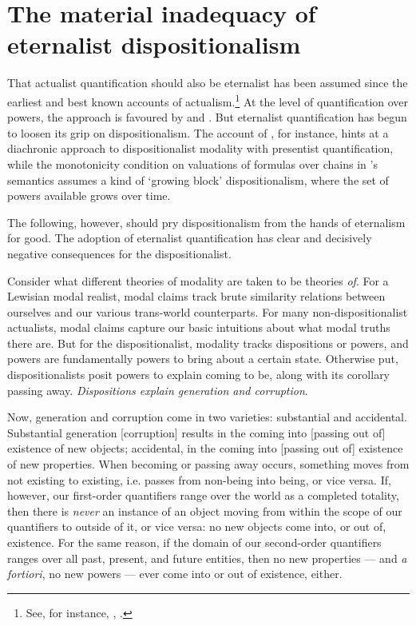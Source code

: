 \documentclass[]{article}
\begin{document}
\section{The material inadequacy of eternalist dispositionalism}
That actualist quantification should also be eternalist has been assumed since the earliest and best known accounts of actualism.\footnote{See, for instance, \cite{Plantinga1976}, \cite{Adams1981}.} At the level of quantification over powers, the approach is favoured by \cite{Yates2015} and \cite{Borghini2008}. But eternalist quantification has begun to loosen its grip on dispositionalism. The account of \cite{Vetter2013}, for instance, hints at a diachronic approach to dispositionalist modality with presentist quantification, while the monotonicity condition on valuations of formulas over chains in \cite{Jacobs2010}'s semantics assumes a kind of `growing block' dispositionalism, where the set of powers available grows over time.

The following, however, should pry dispositionalism from the hands of eternalism for good. The adoption of eternalist quantification has clear and decisively negative consequences for the dispositionalist. 

Consider what different theories of modality are taken to be theories \textit{of}. For a Lewisian modal realist, modal claims track brute similarity relations between ourselves and our various trans-world counterparts. For many non-dispositionalist actualists, modal claims capture our basic intuitions about what modal truths there are. But for the dispositionalist, modality tracks dispositions or powers, and powers are fundamentally powers to bring about a certain state. Otherwise put, dispositionalists posit powers to explain coming to be, along with its corollary passing away. \textit{Dispositions explain generation and corruption}.

Now, generation and corruption come in two varieties: substantial and accidental. Substantial generation [corruption] results in the coming into [passing out of] existence of new objects; accidental, in the coming into [passing out of] existence of new properties. When becoming or passing away occurs, something moves from not existing to existing, i.e. passes from non-being into being, or vice versa. If, however, our first-order quantifiers range over the world as a completed totality, then there is \textit{never} an instance of an object moving from within the scope of our quantifiers to outside of it, or vice versa: no new objects come into, or out of, existence. For the same reason, if the domain of our second-order quantifiers ranges over all past, present, and future entities, then no new properties --- and \textit{a fortiori}, no new powers --- ever come into or out of existence, either. 
\end{document}
